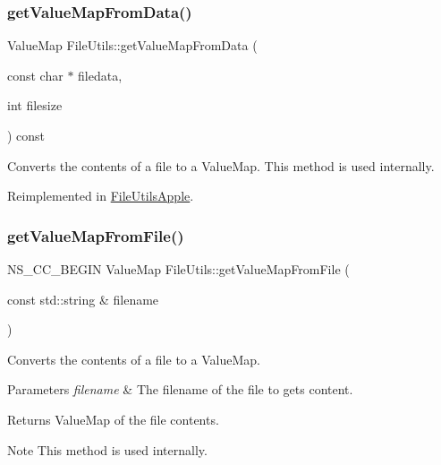 \subsubsection{\texorpdfstring{get\+Value\+Map\+From\+Data()}{getValueMapFromData()}\hspace{0.1cm}{\footnotesize\ttfamily [2/2]}}
{\footnotesize\ttfamily Value\+Map File\+Utils\+::get\+Value\+Map\+From\+Data (\begin{DoxyParamCaption}\item[{const char $\ast$}]{filedata,  }\item[{int}]{filesize }\end{DoxyParamCaption}) const\hspace{0.3cm}{\ttfamily [virtual]}}

Converts the contents of a file to a Value\+Map. This method is used internally. 

Reimplemented in \hyperlink{classFileUtilsApple_a5ecaabfb986144039b4adb55ac463f95}{File\+Utils\+Apple}.

\mbox{\label{classFileUtils_a67aa84a7b5bcfb46a646260c084ad829}} 
\subsubsection{\texorpdfstring{get\+Value\+Map\+From\+File()}{getValueMapFromFile()}\hspace{0.1cm}{\footnotesize\ttfamily [1/2]}}
{\footnotesize\ttfamily N\+S\+\_\+\+C\+C\+\_\+\+B\+E\+G\+IN Value\+Map File\+Utils\+::get\+Value\+Map\+From\+File (\begin{DoxyParamCaption}\item[{const std\+::string \&}]{filename }\end{DoxyParamCaption})\hspace{0.3cm}{\ttfamily [virtual]}}

Converts the contents of a file to a Value\+Map. 
\begin{DoxyParams}{Parameters}
{\em filename} & The filename of the file to gets content. \\
\hline
\end{DoxyParams}
\begin{DoxyReturn}{Returns}
Value\+Map of the file contents. 
\end{DoxyReturn}
\begin{DoxyNote}{Note}
This method is used internally. 
\end{DoxyNote}


